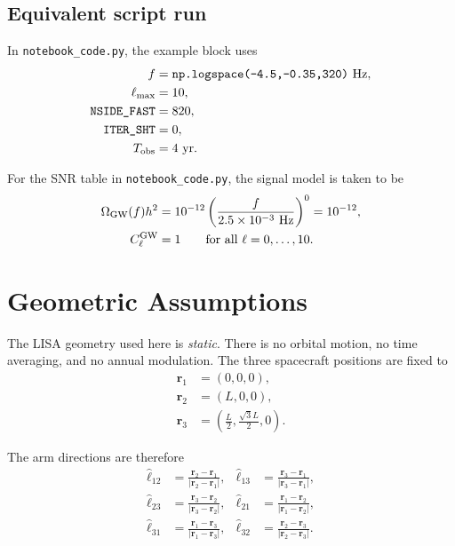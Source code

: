\documentclass[11pt]{article}
\begin{document}
\subsection{Equivalent script run}
In \texttt{notebook\_code.py}, the example block uses
\begin{align}
f &= \text{\texttt{np.logspace(-4.5,-0.35,320)}}~\mathrm{Hz}, \\
\ell_{\max} &= 10, \\
\text{\texttt{NSIDE\_FAST}} &= 820, \\
\text{\texttt{ITER\_SHT}} &= 0, \\
T_{\rm obs} &= 4~\mathrm{yr}.
\end{align}

For the SNR table in \texttt{notebook\_code.py}, the signal model is taken to be
\begin{align}
\Omega_{\rm GW}(f) h^2 &= 10^{-12}\left(\frac{f}{2.5\times 10^{-3}~\mathrm{Hz}}\right)^0 = 10^{-12}, \\
C_\ell^{\rm GW} &= 1 \qquad \text{for all } \ell=0,\dots,10.
\end{align}

\section{Geometric Assumptions}
The LISA geometry used here is \emph{static}. There is no orbital motion, no time averaging, and no annual modulation. The three spacecraft positions are fixed to
\begin{align}
\mathbf{r}_1 &= (0,0,0), \\
\mathbf{r}_2 &= (L,0,0), \\
\mathbf{r}_3 &= \left(\frac{L}{2},\frac{\sqrt{3}L}{2},0\right).
\end{align}

The arm directions are therefore
\begin{align}
\hat{\ell}_{12} &= \frac{\mathbf{r}_2-\mathbf{r}_1}{|\mathbf{r}_2-\mathbf{r}_1|}, &
\hat{\ell}_{13} &= \frac{\mathbf{r}_3-\mathbf{r}_1}{|\mathbf{r}_3-\mathbf{r}_1|}, \\
\hat{\ell}_{23} &= \frac{\mathbf{r}_3-\mathbf{r}_2}{|\mathbf{r}_3-\mathbf{r}_2|}, &
\hat{\ell}_{21} &= \frac{\mathbf{r}_1-\mathbf{r}_2}{|\mathbf{r}_1-\mathbf{r}_2|}, \\
\hat{\ell}_{31} &= \frac{\mathbf{r}_1-\mathbf{r}_3}{|\mathbf{r}_1-\mathbf{r}_3|}, &
\hat{\ell}_{32} &= \frac{\mathbf{r}_2-\mathbf{r}_3}{|\mathbf{r}_2-\mathbf{r}_3|}.
\end{align}
\end{document}
